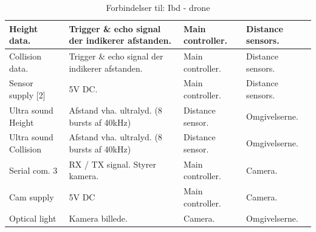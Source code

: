 \begin{table}[H]
\begin{tabular}{|p{3.1 cm}|p{4.9 cm}|p{2.3 cm}|p{2.3 cm}|}
			Height data.		& Trigger \& echo signal der indikerer afstanden. 	& Main \newline controller.	& Distance \newline sensors.	\\ \hline
			Collision data.		& Trigger \& echo signal der indikerer afstanden. 	& Main \newline controller.	& Distance \newline sensors.  \\ \hline
			Sensor supply [2]	& 5V DC.	& Main \newline controller. & Distance \newline sensors.	\\ \hline
			Ultra sound Height			& Afstand vha. ultralyd. \newline (8 bursts af 40kHz) 	& Distance \newline sensor.	& Omgivelserne.	\\ \hline 
			Ultra sound	Collision		& Afstand vha. ultralyd. \newline (8 bursts af 40kHz) 	& Distance \newline sensor.	& Omgivelserne.	\\ \hline 			
				
			Serial com. 3		& RX / TX signal. \newline Styrer kamera.	& Main \newline controller.	& Camera.	\\ \hline
			Cam supply			& 5V DC 	& Main \newline controller.	& Camera.	\\ \hline
			Optical light		& Kamera billede. 	& Camera.	& Omgivelserne.	\\ \hline	
			
		\end{tabular}
	\caption{Forbindelser til: Ibd - drone}
	\label{tab:IBDdrone}
\end{table}

